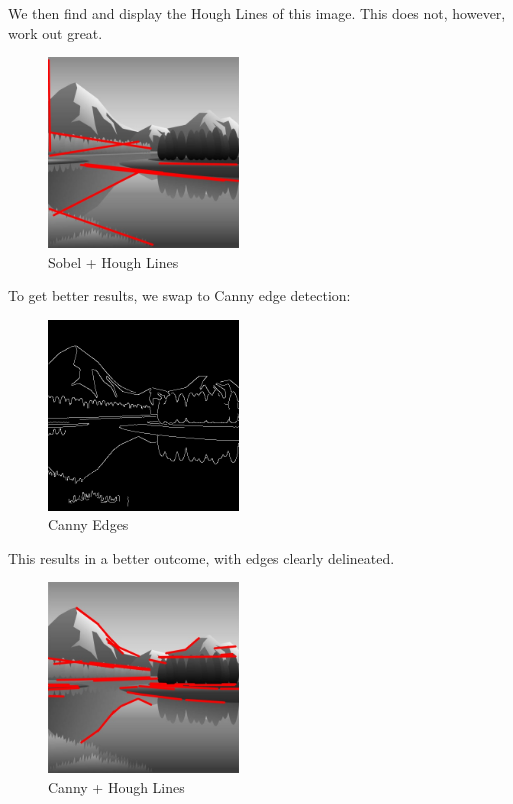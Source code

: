 \documentclass{article}
\begin{document}
We then find and display the Hough Lines of this image. This does not, however, work out great.

\begin{figure}[H]
    \centering
    \includegraphics[width = 0.45\textwidth]{imgs/hough_lines_sobel.jpg}
    \caption{Sobel + Hough Lines}
    \label{fig:1-3}
\end{figure}

To get better results, we swap to Canny edge detection:

\begin{figure}[H]
    \centering
    \includegraphics[width = 0.45\textwidth]{imgs/canny.jpg}
    \caption{Canny Edges}
    \label{fig:1-4}
\end{figure}

This results in a better outcome, with edges clearly delineated.

\begin{figure}[H]
    \centering
    \includegraphics[width = 0.45\textwidth]{imgs/hough_lines_canny.jpg}
    \caption{Canny + Hough Lines}
    \label{fig:1-5}
\end{figure}
\end{document}

